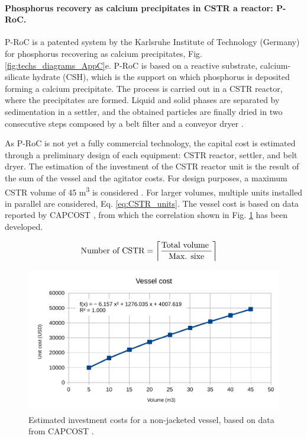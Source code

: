 \begin{refsection}[referencesCh4]
\paragraph{Phosphorus recovery as calcium precipitates in CSTR a reactor: P-RoC.}
P-RoC is a patented system by the Karlsruhe Institute of Technology (Germany) for phosphorus recovering as calcium precipitates, Fig. \ref{fig:techs_diagrams_AppC}e. P-RoC is based on a reactive substrate, calcium-silicate hydrate (CSH), which is the support on which phosphorus is deposited forming a calcium precipitate. The process is carried out in a CSTR reactor, where the precipitates are formed. Liquid and solid phases are separated by sedimentation in a settler, and the obtained particles are finally dried in two consecutive steps composed by a belt filter and a conveyor dryer \citep{ehbrecht_p-recovery_2011}.

As P-RoC is not yet a fully commercial technology, the capital cost is estimated through a preliminary design of each equipment: CSTR reactor, settler, and belt dryer. The estimation of the investment of the CSTR reactor unit is the result of the sum of the vessel and the agitator costs. For design purposes, a maximum CSTR volume of 45 m\textsuperscript{3} is considered \citep{CAPCOST}. For larger volumes, multiple units installed in parallel are considered, Eq. \ref{eq:CSTR_units}. The vessel cost is based on data reported by CAPCOST \citep{CAPCOST}, from which the correlation shown in Fig. \ref{fig:vessel_investment_cost_AppC} has been developed.

\begin{align} \label{eq:CSTR_units}
& \text{Number of CSTR} = \ceil[\bigg]{\frac{\text{Total volume }}{\text{Max. sixe}}}
\end{align}

\begin{figure}[h!]
	\centering
	\includegraphics[width=0.8\linewidth]{gfx/AppendixC/vessel_investment_cost} 
	\caption{Estimated investment costs for a non-jacketed vessel, based on data from CAPCOST \protect\citep{CAPCOST}.}
	\label{fig:vessel_investment_cost_AppC}
\end{figure}


\end{refsection}

